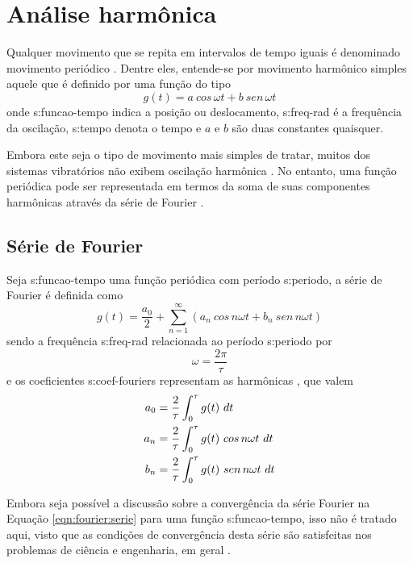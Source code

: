 \documentclass[12pt,openright,oneside,a4paper,
	chapter=TITLE,section=TITLE,
	english,brazil]{abntex2}
\begin{document}
	\section{Análise harmônica}
	Qualquer movimento que se repita em intervalos de tempo iguais é denominado movimento periódico \cite{rao:2008}. Dentre eles, entende-se por movimento harmônico simples aquele que é definido por uma função do tipo \cite{timoshenko:1974}
	\begin{equation}
		g(t) = a\ cos\,\omega t + b\ sen\,\omega t
	\end{equation}
	onde \gls{s:funcao-tempo} indica a posição ou deslocamento, \gls{s:freq-rad} é a frequência da oscilação, \gls{s:tempo} denota o tempo e $ a $ e $ b $ são duas constantes quaisquer.
	
	Embora este seja o tipo de movimento mais simples de tratar, muitos dos sistemas vibratórios não exibem oscilação harmônica \cite{rao:2008}. No entanto, uma função periódica pode ser representada em termos da soma de suas componentes harmônicas através da série de Fourier \cite{clark:1972}.
	
	\subsection{Série de Fourier} \label{sec:fourier:serie}
	Seja \gls{s:funcao-tempo} uma função periódica com período \gls{s:periodo}, a série de Fourier é definida como \cite{spiegel:1977}
	\begin{equation}\label{eqn:fourier:serie}
		g(t) = \frac{a_0}{2} + \sum_{n=1}^{\infty}\left(a_n\ cos\,n\omega t + b_n\ sen\,n\omega t \right)
	\end{equation}
	sendo a frequência \gls{s:freq-rad} relacionada ao período \gls{s:periodo} por \cite{dimarogonas:1995}
	\begin{equation}\label{eqn:fourier:periodo}
		\omega = \frac{2\pi}{\tau}
	\end{equation}
	e os coeficientes \glspl{s:coef-fourier} representam as harmônicas \cite{dimarogonas:1995}, que valem \cite{spiegel:1977}
	\begin{align}\label{eqn:fourier:coefs}
		a_0 &= \frac{2}{\tau}\int_{0}^{\tau}g(t)\ dt \notag\\
		a_n &= \frac{2}{\tau}\int_{0}^{\tau}g(t)\ cos\,n\omega t\ dt \\
		b_n &= \frac{2}{\tau}\int_{0}^{\tau}g(t)\ sen\,n\omega t\ dt \notag
	\end{align}
	
	Embora seja possível a discussão sobre a convergência da série Fourier na Equação \ref{eqn:fourier:serie} para uma função \gls{s:funcao-tempo}, isso não é tratado aqui, visto que as condições de convergência desta série são satisfeitas nos problemas de ciência e engenharia, em geral \cite{spiegel:1977}.
	
\end{document}
